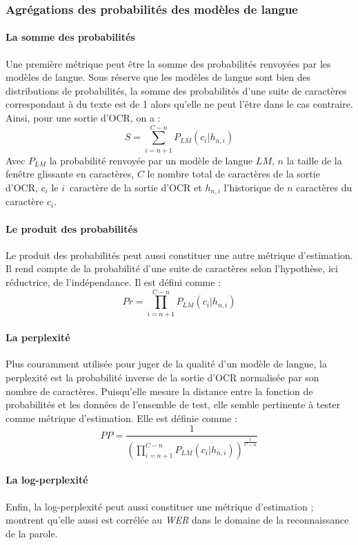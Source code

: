 \documentclass[10pt,twoside]{article}
\begin{document}
        
	   \subsubsection{Agrégations des probabilités des modèles de langue}\label{metrics}
	       \paragraph{La somme des probabilités}
	       Une première métrique peut être la somme des probabilités renvoyées par les modèles de langue. Sous réserve que les 
           modèles de langue sont bien des distributions de probabilités, la somme des probabilités d'une suite de caractères 
           correspondant à du texte est de 1 alors qu'elle ne peut l'être dans le cas contraire. Ainsi,
           pour une
	       sortie d'OCR, on a : 
	       $$S = \sum_{i=n+1}^{C-n}P_{LM}(c_{i} | h_{n,i})$$
	       Avec $P_{LM}$ la probabilité renvoyée par un modèle de langue $LM$, $n$ 
	       la taille de la fenêtre glissante en caractères, $C$ le nombre total de caractères de la sortie d'OCR, $c_{i}$ 
	       le $i$\ieme~caractère de la sortie d'OCR et $h_{n,i}$ l'historique de $n$ caractères du caractère $c_{i}$.

	       \paragraph{Le produit des probabilités}
	       Le produit des probabilités peut aussi constituer une autre métrique d'estimation. Il rend compte de
           la probabilité d'une suite de caractères selon l'hypothèse, ici réductrice, de l'indépendance. 
           Il est défini
	       comme :
	       $$Pr = \prod_{i=n+1}^{C-n}P_{LM}(c_{i} | h_{n,i})$$

	       \paragraph{La perplexité}
	       Plus couramment utilisée pour juger de la qualité d'un modèle de langue, la perplexité est la probabilité inverse de la sortie
	       d'OCR normalisée par son nombre de caractères. Puisqu'elle mesure la distance entre la fonction de probabilités et les données de l'ensemble
           de test, elle semble pertinente à tester comme métrique d'estimation.
           Elle est définie comme : 
	        $$PP = \frac{1}{(\prod_{i=n+1}^{C-n}P_{LM}(c_{i} | h_{n,i}))^{\frac{1}{C-n}}}$$

	       \paragraph{La log-perplexité}
           Enfin, la log-perplexité peut aussi constituer une métrique d'estimation ; \cite{Chen1998a} montrent qu'elle aussi est corrélée au 
           \textit{WER} dans le domaine de la reconnaissance de la parole.
\end{document}
